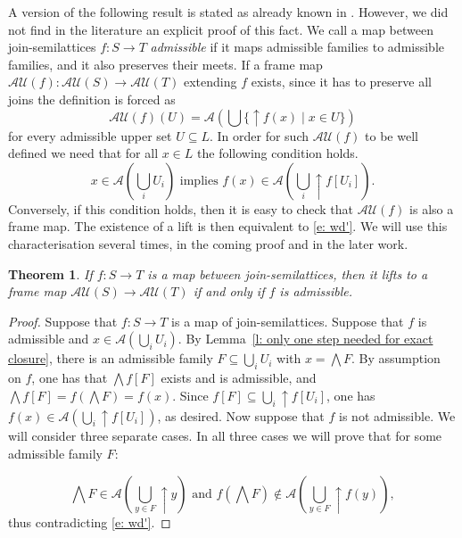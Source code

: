 \documentclass[11pt,a4paper,reqno]{amsart}
\newcommand{\tbigwedge}{\mathop{\textstyle \bigwedge }}%
\newcommand{\tbigcup}{\mathop{\textstyle \bigcup }}%
\newtheorem{theorem}{Theorem}[section]
\theoremstyle{definition}
\theoremstyle{remark}
\newcommand{\ca}[1]{\mathcal{#1}}
\newcommand{\se}{\subseteq}
\newcommand{\up}{{\uparrow}}
\begin{document}
{A version of the following result is stated as already known in \cite{Gehrke14}. However, we did not find in the literature an explicit proof of this fact. We call a map between join-semilattices $f:S\to T$ \emph{admissible} if it maps admissible families to admissible families, and it also preserves their meets. If a frame map $\ca{AU}(f):\ca{AU}(S)\to \ca{AU}(T)$ extending $f$ exists, since it has to preserve all joins the definition is forced as 
\[
\ca{AU}(f)(U)=\ca{A}(\tbigcup\{\up f(x)\mid x\in U\})
\]
for every admissible upper set $U\se L$. In order for such $\ca{AU}(f)$ to be well defined we need that for all $x\in L$ the following condition holds. 
 \begin{equation*}
x\in \ca{A} (\tbigcup_i U_i)\text{ implies }f(x)\in \ca{A}(\tbigcup_i \up f[U_i]).   \tag{WD}
\end{equation*}
Conversely, if this condition holds, then it is easy to check that $\ca{AU}(f)$ is also a frame map. The existence of a lift is then equivalent to \eqref{e: wd'}. We will use this characterisation several times, in the coming proof and in the later work.



\begin{theorem}\label{t: characterize those that lift general}
    If $f:S\to T$ is a map between join-semilattices, then it lifts to a frame map $\ca{AU}(S)\to \ca{AU}(T)$ if and only if $f$ is admissible.
\end{theorem}
\begin{proof}
Suppose that $f:S\to T$ is a map of join-semilattices. Suppose that $f$ is admissible and $x\in \mathcal{A}(\bigcup_i U_i)$. By Lemma~\ref{l: only one step needed for exact closure}, there is an admissible family $F\se \tbigcup_i U_i$ with $x=\tbigwedge F$. By assumption on $f$, one has  that $\tbigwedge f[F]$ exists and is admissible, and $\tbigwedge f[F]=f(\tbigwedge F)=f(x)$. Since $f[F]\se \tbigcup_i \up f[U_i]$, one has $f(x)\in \ca{A}(\tbigcup_i \up f[U_i])$, as desired. Now suppose that $f$ is not admissible. We will consider three separate cases. In all three cases we will prove that for some admissible family $F$:

\begin{equation}\label{negation of WD'}
\tbigwedge F\in \ca{A} (\tbigcup_{y\in F} \up y)\text{ and }f(\tbigwedge F)\notin \ca{A}(\tbigcup_{y\in F} \up f(y)),
\end{equation}
thus contradicting \eqref{e: wd'}.


\end{proof}}
\end{document}
